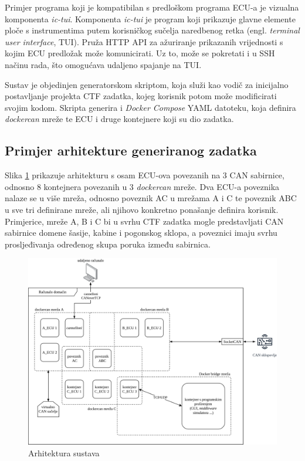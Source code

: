 \documentclass[times, utf8, diplomski, numeric]{fer}
\begin{document}
Primjer programa koji je kompatibilan s predloškom programa ECU-a je vizualna komponenta \textit{ic-tui}. Komponenta \textit{ic-tui} je program koji prikazuje glavne elemente ploče s instrumentima putem korisničkog sučelja naredbenog retka (engl. \textit{terminal user interface}, TUI). Pruža HTTP API za ažuriranje prikazanih vrijednosti s kojim ECU predložak može komunicirati. Uz to, može se pokretati i u SSH načinu rada, što omogućava udaljeno spajanje na TUI.

Sustav je objedinjen generatorskom skriptom, koja služi kao vodič za inicijalno postavljanje projekta CTF zadatka, kojeg korisnik potom može modificirati svojim kodom. Skripta generira i \textit{Docker Compose} YAML datoteku, koja definira \textit{dockercan} mreže te ECU i druge kontejnere koji su dio zadatka.

\subsection{Primjer arhitekture generiranog zadatka }
Slika \ref{fig:arhitekturasustava} prikazuje arhitekturu s osam ECU-ova povezanih na 3 CAN sabirnice, odnosno 8 kontejnera povezanih u 3 \textit{dockercan} mreže. Dva ECU-a poveznika nalaze se u više mreža, odnosno poveznik AC u mrežama A i C te poveznik ABC u sve tri definirane mreže, ali njihovo konkretno ponašanje definira korisnik. Primjerice, mreže A, B i C bi u svrhu CTF zadatka mogle predstavljati CAN sabirnice domene šasije, kabine i pogonskog sklopa, a poveznici imaju svrhu prosljeđivanja određenog skupa poruka između sabirnica.

\begin{figure}[htb]
\centering
\includegraphics[width=\textwidth]{arhitektura2.png}
\caption{Arhitektura sustava}
\label{fig:arhitekturasustava}
\end{figure}
\end{document}
